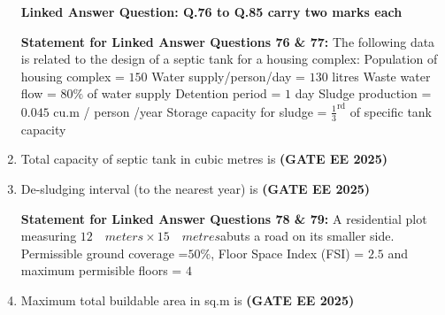 \documentclass[journal,12pt,onecolumn]{IEEEtran}
\theoremstyle{remark}
\begin{document}
\begin{enumerate}
\begin{center}
    \textbf{Linked Answer Question: Q.76 to Q.85 carry two marks each}
\end{center}
\textbf{Statement for Linked Answer Questions 76 \& 77:}
\newline
The following data is related to the design of a septic tank for a housing complex:
\newline
Population of housing complex = $150$ \newline
Water supply/person/day = $130$ litres \newline
Waste water flow = $80\%$ of water supply \newline
Detention period = $1$ day \newline
Sludge production = $0.045$ cu.m / person /year \newline Storage capacity for sludge = $\frac{1}{3}^\text{rd}$ of specific tank capacity
\newline
\item Total capacity of septic tank in cubic metres is \hfill\textbf{(GATE EE 2025)}
\begin{enumerate}
\end{enumerate}
\item De-sludging interval (to the nearest year) is \hfill\textbf{(GATE EE 2025)}
\begin{enumerate}
\end{enumerate}
\textbf{Statement for Linked Answer Questions 78 \& 79:}
\newline
A residential plot measuring $12 \quad meters \times 15 \quad metres $abuts a road on its smaller side. Permissible ground coverage =$50\%$, Floor Space Index (FSI) = $2.5$ and maximum permisible floors = $4$
\newline
\item Maximum total buildable area in sq.m is \hfill\textbf{(GATE EE 2025)}

\end{enumerate}
\end{document}
